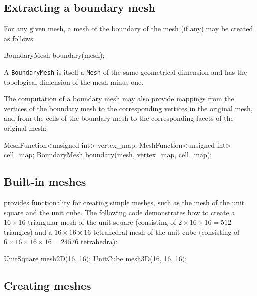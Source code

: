 \subsection{Extracting a boundary mesh}

For any given mesh, a mesh of the boundary of the mesh (if any) may be
created as follows:
\begin{code}
  BoundaryMesh boundary(mesh);
\end{code}
A \texttt{BoundaryMesh} is itself a \texttt{Mesh} of the same
geometrical dimension and has the topological dimension of the mesh
minus one.

The computation of a boundary mesh may also provide mappings from the
vertices of the boundary mesh to the corresponding vertices in the
original mesh, and from the cells of the boundary mesh to the
corresponding facets of the original mesh:
\begin{code}
  MeshFunction<unsigned int> vertex_map,
  MeshFunction<unsigned int> cell_map;
  BoundaryMesh boundary(mesh, vertex_map, cell_map);
\end{code}

\subsection{Built-in meshes}

\dolfin{} provides functionality for creating simple meshes, such as
the mesh of the unit square and the unit cube. The following code
demonstrates how to create a $16\times 16$ triangular mesh of the unit square
(consisting of $2\times 16\times 16 = 512$ triangles) and a
$16\times 16\times 16$ tetrahedral mesh of the unit cube (consisting
of $6\times 16\times 16\times 16 = 24576$ tetrahedra):
\begin{code}
  UnitSquare mesh2D(16, 16);
  UnitCube mesh3D(16, 16, 16);
\end{code}


\subsection{Creating meshes}

